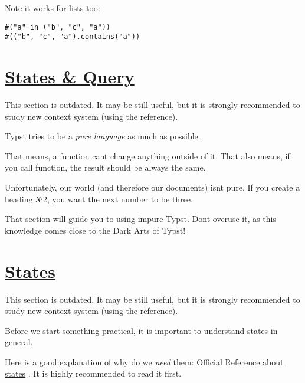 \pandocbounded{}

Note it works for lists too:

\begin{verbatim}
#("a" in ("b", "c", "a"))
#(("b", "c", "a").contains("a"))
\end{verbatim}

\pandocbounded{}

\section{\texorpdfstring{\hyperref[states--query]{States \&
Query}}{States \& Query}}\label{states--query}

This section is outdated. It may be still useful, but it is strongly
recommended to study new context system (using the reference).

Typst tries to be a \emph{pure language} as much as possible.

That means, a function can\textquotesingle t change anything outside of
it. That also means, if you call function, the result should be always
the same.

Unfortunately, our world (and therefore our documents)
isn\textquotesingle t pure. If you create a heading №2, you want the
next number to be three.

That section will guide you to using impure Typst. Don\textquotesingle t
overuse it, as this knowledge comes close to the Dark Arts of Typst!

\section{\texorpdfstring{\hyperref[states]{States}}{States}}\label{states}

This section is outdated. It may be still useful, but it is strongly
recommended to study new context system (using the reference).

Before we start something practical, it is important to understand
states in general.

Here is a good explanation of why do we \emph{need} them:
\href{https://typst.app/docs/reference/meta/state/}{Official Reference
about states} . It is highly recommended to read it first.

